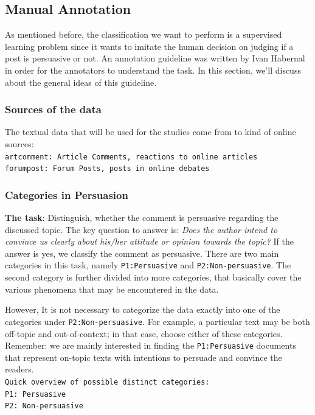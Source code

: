 \subsection{Manual Annotation}
As mentioned before, the classification we want to perform is a supervised learning problem since it wants to imitate the human decision on judging if a post is persuasive or not. An annotation guideline was written by Ivan Habernal \cite{ivanguideline} in order for the annotators to understand the task. In this section, we'll discuss about the general ideas of this guideline.
\subsubsection{Sources of the data}
The textual data that will be used for the studies come from to kind of online sources:
\\
\texttt{artcomment: Article Comments, reactions to online articles}
\\
\texttt{forumpost: Forum Posts, posts in online debates}
\subsubsection{Categories in Persuasion}
\textbf{The task}: Distinguish, whether the comment is persuasive regarding the discussed topic. The key question to answer is: \textit{Does the author intend to convince us clearly about his/her attitude or opinion towards the topic?} If the answer is yes, we classify the comment as persuasive. There are two main categories in this task, namely \texttt{P1:Persuasive} and \texttt{P2:Non-persuasive}. The second category is further divided into more categories, that basically cover the various phenomena that may be encountered in the data.

However, It is not necessary to categorize the data exactly into one of the categories under \texttt{P2:Non-persuasive}. For example, a particular text may be both off-topic and out-of-context; in that case, choose either of these categories.
\\
Remember: we are mainly interested in finding the \texttt{P1:Persuasive} documents that represent on-topic texts with intentions to persuade and convince the readers.
\vspace{0.1cm}
\\
\texttt{Quick overview of possible distinct categories:}
\\
\texttt{P1: Persuasive}
\\
\texttt{P2: Non-persuasive}

